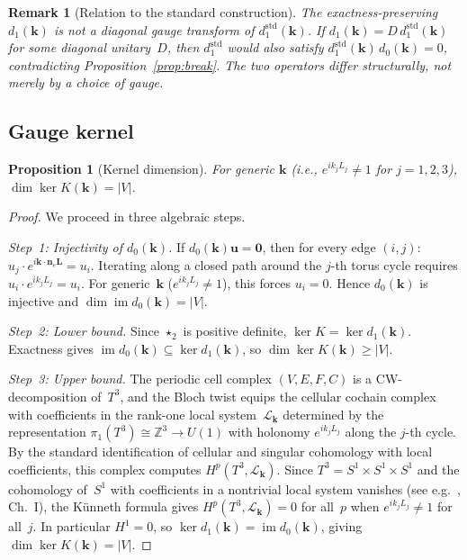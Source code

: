 \documentclass[preprint,12pt]{elsarticle}
\newtheorem{proposition}{Proposition}
\newtheorem{remark}{Remark}
\begin{document}
\begin{remark}[Relation to the standard construction]
The exactness-preserving $d_1(\mathbf{k})$ is not a diagonal gauge transform of $d_1^{\mathrm{std}}(\mathbf{k})$. If $d_1(\mathbf{k}) = D\,d_1^{\mathrm{std}}(\mathbf{k})$ for some diagonal unitary~$D$, then $d_1^{\mathrm{std}}$ would also satisfy $d_1^{\mathrm{std}}(\mathbf{k})\,d_0(\mathbf{k}) = 0$, contradicting Proposition~\ref{prop:break}. The two operators differ structurally, not merely by a choice of gauge.
\end{remark}

\subsection{Gauge kernel}

\begin{proposition}[Kernel dimension]\label{prop:kernel}
For generic $\mathbf{k}$ (i.e., $e^{ik_j L_j} \neq 1$ for $j = 1,2,3$), $\dim\ker K(\mathbf{k}) = |V|$.
\end{proposition}

\begin{proof}
We proceed in three algebraic steps.

\emph{Step~1: Injectivity of $d_0(\mathbf{k})$.} If $d_0(\mathbf{k})\mathbf{u} = \mathbf{0}$, then for every edge $(i,j)$: $u_j \cdot e^{i\mathbf{k}\cdot\mathbf{n}_e\mathbf{L}} = u_i$. Iterating along a closed path around the $j$-th torus cycle requires $u_i \cdot e^{ik_j L_j} = u_i$. For generic~$\mathbf{k}$ ($e^{ik_j L_j} \neq 1$), this forces $u_i = 0$. Hence $d_0(\mathbf{k})$ is injective and $\dim\operatorname{im} d_0(\mathbf{k}) = |V|$.

\emph{Step~2: Lower bound.} Since $\star_2$ is positive definite, $\ker K = \ker d_1(\mathbf{k})$. Exactness gives $\operatorname{im} d_0(\mathbf{k}) \subseteq \ker d_1(\mathbf{k})$, so $\dim\ker K(\mathbf{k}) \geq |V|$.

\emph{Step~3: Upper bound.} The periodic cell complex $(V, E, F, C)$ is a CW-decomposition of~$T^3$, and the Bloch twist equips the cellular cochain complex with coefficients in the rank-one local system~$\mathcal{L}_\mathbf{k}$ determined by the representation $\pi_1(T^3) \cong \mathbb{Z}^3 \to U(1)$ with holonomy $e^{ik_j L_j}$ along the $j$-th cycle. By the standard identification of cellular and singular cohomology with local coefficients, this complex computes $H^p(T^3, \mathcal{L}_\mathbf{k})$. Since $T^3 = S^1 \times S^1 \times S^1$ and the cohomology of~$S^1$ with coefficients in a nontrivial local system vanishes (see e.g.\ \cite{Bott1982}, Ch.~I), the K\"unneth formula gives $H^p(T^3, \mathcal{L}_\mathbf{k}) = 0$ for all~$p$ when $e^{ik_j L_j} \neq 1$ for all~$j$. In particular $H^1 = 0$, so $\ker d_1(\mathbf{k}) = \operatorname{im} d_0(\mathbf{k})$, giving $\dim\ker K(\mathbf{k}) = |V|$.
\end{proof}
\end{document}
